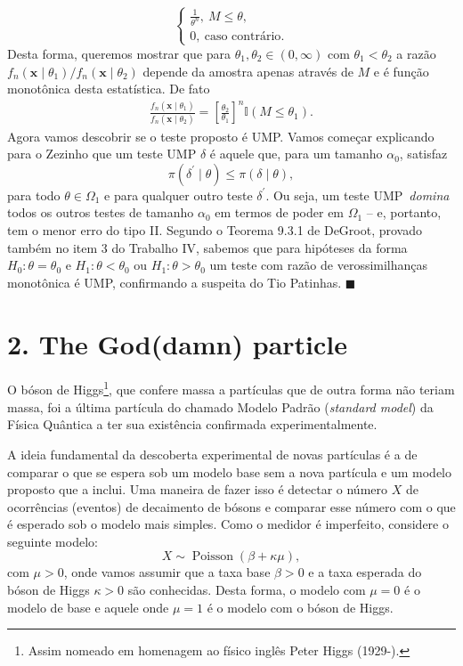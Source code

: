 \documentclass[a4paper,10pt, notitlepage]{report}
\newcommand{\bx}{\boldsymbol{x}} %
\begin{document}
{\begin{equation*}
\begin{cases}
 \frac{1}{\theta^n},\: M \leq \theta,\\
   0,\:\text{caso contrário}.
                         \end{cases}
\end{equation*}
Desta forma, queremos mostrar que para $\theta_1, \theta_2 \in (0, \infty)$ com $\theta_1 < \theta_2$ a razão $f_n(\bx \mid \theta_1)/ f_n(\bx \mid \theta_2)$ depende da amostra apenas através de $M$ e é função monotônica desta estatística.
De fato
\begin{align*}
 \frac{f_n(\bx \mid \theta_1)}{ f_n(\bx \mid \theta_2)} = \left[\frac{\theta_2}{\theta_1}\right]^n\mathbb{I}(M \leq \theta_1).
\end{align*}
Agora vamos descobrir se o teste proposto é UMP.
Vamos começar explicando para o Zezinho que um teste UMP $\delta$ é aquele que, para um tamanho $\alpha_0$, satisfaz 
\begin{equation*}
 \pi(\delta^\prime \mid \theta) \leq \pi(\delta \mid \theta),
\end{equation*}
para todo $\theta \in \Omega_1$ e para qualquer outro teste $\delta^\prime$.
Ou seja, um teste UMP~\textit{domina} todos os outros testes de tamanho $\alpha_0$ em termos de poder em $\Omega_1$ -- e, portanto, tem o menor erro do tipo II.
Segundo o Teorema 9.3.1 de DeGroot, provado também no item 3 do Trabalho IV, sabemos que para hipóteses da forma $H_0: \theta = \theta_0$  e $H_1 : \theta < \theta_0$ ou $H_1: \theta > \theta_0$ um teste com razão de verossimilhanças monotônica é UMP, confirmando a suspeita do Tio Patinhas.
$\blacksquare$
}

\section*{2. The God(damn) particle}

O bóson de Higgs\footnote{Assim nomeado em homenagem ao físico inglês Peter Higgs (1929-).}, que confere massa a partículas que de outra forma não teriam massa, foi a última partícula do chamado Modelo Padrão (\textit{standard model}) da Física Quântica a ter sua existência confirmada experimentalmente.

A ideia fundamental da descoberta experimental de novas partículas é a de comparar o que se espera sob um modelo base sem a nova partícula e um modelo proposto que a inclui.
Uma maneira de fazer isso é detectar o número $X$ de ocorrências (eventos) de decaimento de bósons e comparar esse número com o que é esperado sob o modelo mais simples.
Como o medidor é imperfeito, considere o seguinte modelo:
\begin{equation*}
 X \sim \operatorname{Poisson}(\beta  + \kappa\mu),
\end{equation*}
com $\mu >0$, onde vamos assumir que a taxa base $\beta > 0$ e a taxa esperada do bóson de Higgs $\kappa >0$ são conhecidas.
Desta forma, o modelo com $\mu = 0$ é o modelo de base e aquele onde $\mu =1$ é o modelo com o bóson de Higgs.
\end{document}
